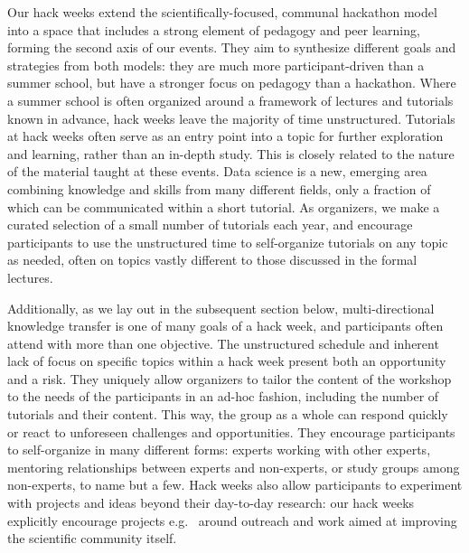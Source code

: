 Our hack weeks extend the scientifically-focused, communal hackathon model into a space that includes a strong element of pedagogy and peer learning, forming the second axis of our events. They aim to synthesize different goals and strategies from both models: they are much more participant-driven than a summer school, but have a stronger focus on pedagogy than a hackathon. Where a summer school is often organized around a framework of lectures and tutorials known in advance, hack weeks leave the majority of time unstructured. Tutorials at hack weeks often serve as an entry point into a topic for further exploration and learning, rather than an in-depth study. This is closely related to the nature of the material taught at these events. Data science is a new, emerging area combining knowledge and skills from many different fields, only a fraction of which can be communicated within a short tutorial. As organizers, we make a curated selection of a small number of tutorials each year, and encourage participants to use the unstructured time to self-organize tutorials on any topic as needed, often on topics vastly different to those discussed in the formal lectures. 

Additionally, as we lay out in the subsequent section below, multi-directional knowledge transfer is one of many goals of a hack week, and participants often attend with more than one objective. The unstructured schedule and inherent lack of focus on specific topics within a hack week present both an opportunity and a risk. They uniquely allow organizers to tailor the content of the workshop to the needs of the participants in an ad-hoc fashion, including the number of tutorials and their content. This way, the group as a whole can respond quickly or react to unforeseen challenges and opportunities. They encourage participants to self-organize in many different forms: experts working with other experts, mentoring relationships between experts and non-experts, or study groups among non-experts, to name but a few. Hack weeks also allow participants to experiment with projects and ideas beyond their day-to-day research: our hack weeks explicitly encourage projects e.g.~ around outreach and work aimed at improving the scientific community itself. 

